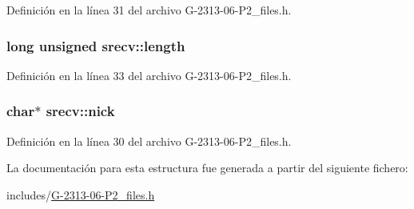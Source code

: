 Definición en la línea 31 del archivo G-\/2313-\/06-\/\+P2\+\_\+files.\+h.

\subsubsection[{\texorpdfstring{length}{length}}]{\setlength{\rightskip}{0pt plus 5cm}long unsigned srecv\+::length}\hypertarget{structsrecv_af681620ef61aa562c7d575773f156761}{}\label{structsrecv_af681620ef61aa562c7d575773f156761}


Definición en la línea 33 del archivo G-\/2313-\/06-\/\+P2\+\_\+files.\+h.

\subsubsection[{\texorpdfstring{nick}{nick}}]{\setlength{\rightskip}{0pt plus 5cm}char$\ast$ srecv\+::nick}\hypertarget{structsrecv_abe3a30e845f4f2f6e47aac6583af3166}{}\label{structsrecv_abe3a30e845f4f2f6e47aac6583af3166}


Definición en la línea 30 del archivo G-\/2313-\/06-\/\+P2\+\_\+files.\+h.



La documentación para esta estructura fue generada a partir del siguiente fichero\+:\begin{DoxyCompactItemize}
\item 
includes/\hyperlink{G-2313-06-P2__files_8h}{G-\/2313-\/06-\/\+P2\+\_\+files.\+h}\end{DoxyCompactItemize}
